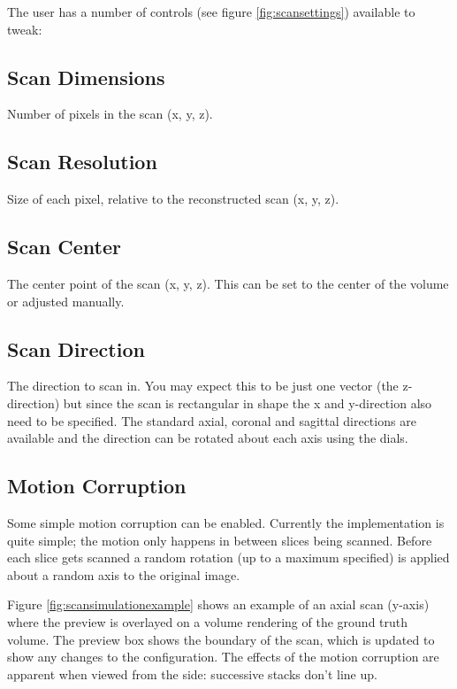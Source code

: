 The user has a number of controls (see figure \ref{fig:scansettings}) available to tweak:

\subsection*{Scan Dimensions}
Number of pixels in the scan (x, y, z).

\subsection*{Scan Resolution}
Size of each pixel, relative to the reconstructed scan (x, y, z).

\subsection*{Scan Center}
The center point of the scan (x, y, z). This can be set to the center of the volume or adjusted manually.

\subsection*{Scan Direction}
The direction to scan in. You may expect this to be just one vector (the z-direction) but since the scan is rectangular in shape the x and y-direction also need to be specified. The standard axial, coronal and sagittal directions are available and the direction can be rotated about each axis using the dials.

\subsection*{Motion Corruption}
Some simple motion corruption can be enabled. Currently the implementation is quite simple; the motion only happens in between slices being scanned. Before each slice gets scanned a random rotation (up to a maximum specified) is applied about a random axis to the original image.

Figure \ref{fig:scansimulationexample} shows an example of an axial scan (y-axis) where the preview is overlayed on a volume rendering of the ground truth volume. The preview box shows the boundary of the scan, which is updated to show any changes to the configuration. The effects of the motion corruption are apparent when viewed from the side: successive stacks don't line up.

